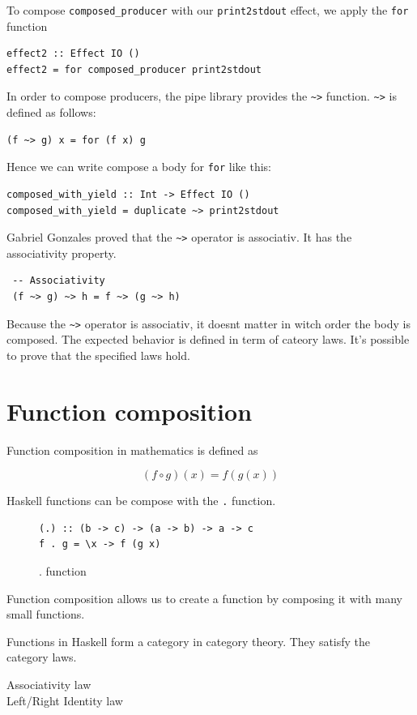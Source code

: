 \documentclass[twoside, a4paper]{article}
\begin{document}
To compose \verb|composed_producer| with our \verb|print2stdout| effect, we apply the \verb|for| function

\begin{verbatim}
effect2 :: Effect IO ()
effect2 = for composed_producer print2stdout
\end{verbatim}

In order to compose producers, the pipe library provides the \verb|~>| function. \verb|~>| is defined as follows:
\begin{verbatim}
(f ~> g) x = for (f x) g
\end{verbatim}

Hence we can write compose a body for \verb|for| like this:
\begin{verbatim}
composed_with_yield :: Int -> Effect IO ()
composed_with_yield = duplicate ~> print2stdout
\end{verbatim}

Gabriel Gonzales proved that the \verb|~>| operator is associativ. It has the associativity property.

\begin{verbatim}
 -- Associativity
 (f ~> g) ~> h = f ~> (g ~> h)
\end{verbatim}

Because the \verb|~>| operator is associativ, it doesnt matter in witch order the body is composed. The expected behavior is defined in term of cateory laws. It's possible to prove that the specified laws hold.

\section{Function composition}

\label{sec:functioncomposition}

Function composition in mathematics is defined as

\begin{equation}
  \label{eq:functioncomposition}
  (f \circ g)(x) = f(g(x))
\end{equation}

Haskell functions can be compose with the \verb|.| function.

\begin{figure}
  \centering
\begin{verbatim}
(.) :: (b -> c) -> (a -> b) -> a -> c
f . g = \x -> f (g x)
\end{verbatim}
  \caption{. function}
  \label{fig:compositionfunction}
\end{figure}

Function composition allows us to create a function by composing it with many small functions. 

Functions in Haskell form a category in category theory. They satisfy the category laws.
\begin{description}
\item[Associativity law] 
\item[Left/Right Identity law] 
\end{description}



\end{document}
